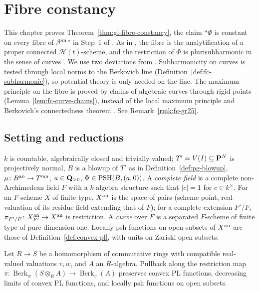 \section{Fibre constancy}\label{sec:fc}

This chapter proves Theorem~\ref{thm:gl-fibre-constancy}, the claim ``$\Phi$ is constant on every fibre of $\beta^{\mathrm{an}}$''
in Step~1 of \cite[Theorem~6.1]{FHX}. As in \cite{FHX}, the fibre is the analytification of a proper connected
$\mathcal H(t)$-scheme, and the restriction of $\Phi$ is plurisubharmonic in the sense of curves \cite[Definition~4.1]{GR25}.
We use two deviations from \cite{GR25}. Subharmonicity on curves is tested through local norms to the Berkovich
line (Definition~\ref{def:fc-subharmonic}), so potential theory is only needed on the line. The maximum principle on
the fibre is proved by chains of algebraic curves through rigid points (Lemma~\ref{lem:fc-curve-chains}), instead of
the local maximum principle \cite[Theorem~6.1]{GR25} and Berkovich's connectedness theorem \cite[3.4.8]{Berkovich90}.
See Remark~\ref{rmk:fc-gr25}.

\subsection{Setting and reductions}\label{subsec:fc-setting}

\begin{convention}\label{conv:fc-setting}
\notready
{}
$k$ is countable, algebraically closed and trivially valued; $T'=V(I)\subseteq\mathbf{P}^N$ is projectively normal, $B$ is a
blowup of $T'$ as in Definition~\ref{def:pg-blowup}, $\mu\colon B^{\mathrm{an}}\to T'^{\mathrm{an}}$, $a\in\mathbf{Q}_{>0}$, $\Phi\in\operatorname{PSH}(B,(a,0))$.
A \emph{complete field} is a complete non-Archimedean field $F$ with a $k$-algebra structure such that $|c|=1$ for
$c\in k^\times$. For an $F$-scheme $X$ of finite type, $X^{\mathrm{an}}$ is the space of pairs (scheme point, real valuation of
its residue field extending that of $F$); for a complete extension $F'/F$, $\pi_{F'/F}\colon X_{F'}^{\mathrm{an}}\to X^{\mathrm{an}}$ is
restriction. A \emph{curve} over $F$ is a separated $F$-scheme of finite type of pure dimension one. Locally psh
functions on open subsets of $X^{\mathrm{an}}$ are those of Definition~\ref{def:convex-pl}, with units on Zariski open subsets.
\end{convention}

\begin{lemma}\label{lem:fc-affine-base-change-psh}
\leanok
{}
Let $R\to S$ be a homomorphism of commutative rings with compatible real-valued valuations $v,w$, and $A$ an
$R$-algebra. Pullback along the restriction map
$\pi\colon\operatorname{Berk}_w(S\otimes_RA)\to\operatorname{Berk}_v(A)$ preserves convex PL functions,
decreasing limits of convex PL functions, and locally psh functions on open subsets.
\end{lemma}

